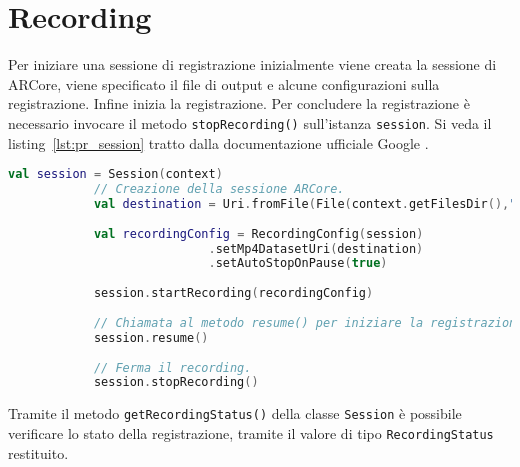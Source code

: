\documentclass[crop=false, class=book]{standalone}
\begin{document}
	\section{Recording}
	Per iniziare una sessione di registrazione inizialmente viene creata la sessione di ARCore, viene specificato il file di output e alcune configurazioni sulla registrazione. Infine inizia la registrazione. Per concludere la registrazione è necessario invocare il metodo \verb|stopRecording()| sull'istanza \verb|session|. Si veda il listing~\vref{lst:pr_session} tratto dalla documentazione ufficiale Google \cite{google2022rec2}.
	
	\begin{center}
		\begin{minipage}{0.95\textwidth}
			\begin{lstlisting}[caption={Creazione della sessione per recording.}, label={lst:pr_session}, language=Kotlin]
val session = Session(context)
			// Creazione della sessione ARCore.
			val destination = Uri.fromFile(File(context.getFilesDir(),"recording.mp4"))
			
			val recordingConfig = RecordingConfig(session)
							.setMp4DatasetUri(destination)
							.setAutoStopOnPause(true)
							
			session.startRecording(recordingConfig)
			
			// Chiamata al metodo resume() per iniziare la registrazione.
			session.resume()
			
			// Ferma il recording.
			session.stopRecording()
			\end{lstlisting}
		\end{minipage}
	\end{center}	

	\noindent
	Tramite il metodo \verb|getRecordingStatus()| della classe \verb|Session| è possibile verificare lo stato della registrazione, tramite il valore di tipo \verb|RecordingStatus| restituito.
\end{document}

